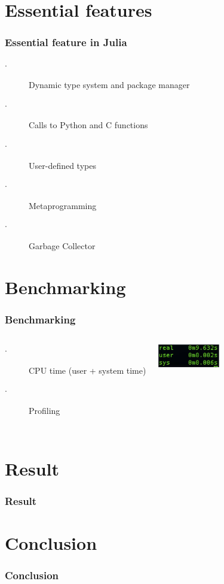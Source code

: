 \documentclass[t, aspectratio=169]{beamer}
\begin{document}
	\section{Essential features}
	\begin{frame}
		\frametitle{Essential feature in Julia}
		\begin{description}
			\item[$\cdot$] Dynamic type system and package manager
			\item[$\cdot$] Calls to Python and C functions
			\item[$\cdot$] User-defined types
			\item[$\cdot$] Metaprogramming
			\item[$\cdot$] Garbage Collector
		\end{description}
	\end{frame}
	\section{Benchmarking}
	\begin{frame}
		\frametitle{Benchmarking}
		\begin{columns}[c] %
		\begin{description}
			\item[$\cdot$] CPU time (user + system time)
			\item[$\cdot$] Profiling
		\end{description}
			\includegraphics[height=1cm]{img/time.png}
		\end{columns}
	\end{frame}
	\section{Result}
	\begin{frame}
		\frametitle{Result}
		
	\end{frame}
	\section{Conclusion}
	\begin{frame}
		\frametitle{Conclusion}
	\end{frame}
\end{document}

